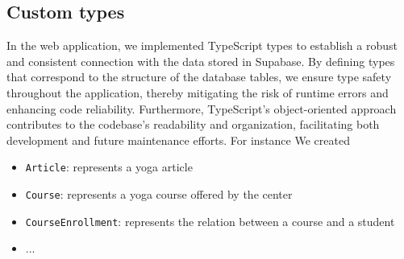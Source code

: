 \subsection{Custom types}

In the web application, we implemented TypeScript types to establish a robust and consistent connection with the data
stored in Supabase. By defining types that correspond to the structure of the database tables, we ensure type safety
throughout the application, thereby mitigating the risk of runtime errors and enhancing code reliability. Furthermore,
TypeScript’s object-oriented approach contributes to the codebase’s readability and organization, facilitating both
development and future maintenance efforts. For instance We created
\begin{itemize}
    \item \texttt{Article}: represents a yoga article
    \item \texttt{Course}: represents a yoga course offered by the center
    \item \texttt{CourseEnrollment}: represents the relation between a course and a student
    \item ...
\end{itemize}

